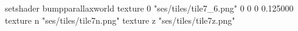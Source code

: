 setshader bumpparallaxworld
texture 0 "ses/tiles/tile7_6.png" 0 0 0 0.125000
texture n "ses/tiles/tile7n.png"
texture z "ses/tiles/tile7z.png"

